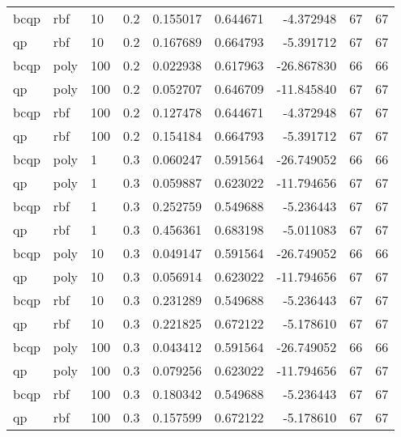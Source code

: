 \begin{tabular}{llllrrrrr}
bcqp &    rbf &  10 &     0.2 &  0.155017 &  0.644671 &  -4.372948 &           67 &         67 \\
  qp &    rbf &  10 &     0.2 &  0.167689 &  0.664793 &  -5.391712 &           67 &         67 \\
bcqp &   poly & 100 &     0.2 &  0.022938 &  0.617963 & -26.867830 &           66 &         66 \\
  qp &   poly & 100 &     0.2 &  0.052707 &  0.646709 & -11.845840 &           67 &         67 \\
bcqp &    rbf & 100 &     0.2 &  0.127478 &  0.644671 &  -4.372948 &           67 &         67 \\
  qp &    rbf & 100 &     0.2 &  0.154184 &  0.664793 &  -5.391712 &           67 &         67 \\
bcqp &   poly &   1 &     0.3 &  0.060247 &  0.591564 & -26.749052 &           66 &         66 \\
  qp &   poly &   1 &     0.3 &  0.059887 &  0.623022 & -11.794656 &           67 &         67 \\
bcqp &    rbf &   1 &     0.3 &  0.252759 &  0.549688 &  -5.236443 &           67 &         67 \\
  qp &    rbf &   1 &     0.3 &  0.456361 &  0.683198 &  -5.011083 &           67 &         67 \\
bcqp &   poly &  10 &     0.3 &  0.049147 &  0.591564 & -26.749052 &           66 &         66 \\
  qp &   poly &  10 &     0.3 &  0.056914 &  0.623022 & -11.794656 &           67 &         67 \\
bcqp &    rbf &  10 &     0.3 &  0.231289 &  0.549688 &  -5.236443 &           67 &         67 \\
  qp &    rbf &  10 &     0.3 &  0.221825 &  0.672122 &  -5.178610 &           67 &         67 \\
bcqp &   poly & 100 &     0.3 &  0.043412 &  0.591564 & -26.749052 &           66 &         66 \\
  qp &   poly & 100 &     0.3 &  0.079256 &  0.623022 & -11.794656 &           67 &         67 \\
bcqp &    rbf & 100 &     0.3 &  0.180342 &  0.549688 &  -5.236443 &           67 &         67 \\
  qp &    rbf & 100 &     0.3 &  0.157599 &  0.672122 &  -5.178610 &           67 &         67 \\
\bottomrule
\end{tabular}
